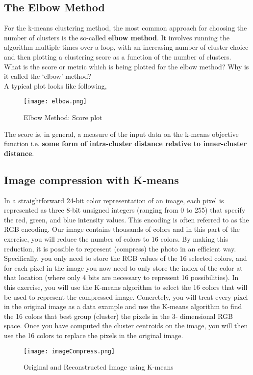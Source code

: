     \subsection{The Elbow Method}
        For the k-means clustering method, the most common approach for choosing the number of clusters is the so-called \textbf{elbow method}. It involves running the algorithm multiple times over a loop, with an increasing number of cluster choice and then plotting a clustering score as a function of the number of clusters.\\

        What is the score or metric which is being plotted for the elbow method? Why is it called the ‘elbow’ method?\\

        A typical plot looks like following,

        \begin{figure}[h]
            \centering
            \texttt{[image: elbow.png]}
            \caption{Elbow Method: Score plot}
        \end{figure}

        The score is, in general, a measure of the input data on the k-means objective function i.e. \textbf{some form of intra-cluster distance relative to inner-cluster distance}.

    \subsection{Image compression with K-means}
        In a straightforward 24-bit color representation of an image, each pixel is represented as three 8-bit unsigned integers (ranging from 0 to 255) that specify the red, green, and blue intensity values. This encoding is often referred to as the RGB encoding. Our image contains thousands of colors and in this part of the exercise, you will reduce the number of colors to 16 colors.
        By making this reduction, it is possible to represent (compress) the photo
        in an efficient way. Specifically, you only need to store the RGB values of
        the 16 selected colors, and for each pixel in the image you now need to only
        store the index of the color at that location (where only 4 bits are necessary
        to represent 16 possibilities).
        In this exercise, you will use the K-means algorithm to select the 16 colors that will be used to represent the compressed image. Concretely, you will
        treat every pixel in the original image as a data example and use the K-means
        algorithm to find the 16 colors that best group (cluster) the pixels in the 3-
        dimensional RGB space. Once you have computed the cluster centroids on the image, you will then use the 16 colors to replace the pixels in the original image.

        \begin{figure}[h]
            \centering
            \texttt{[image: imageCompress.png]}
            \caption{Original and Reconstructed Image using K-means}
        \end{figure}        